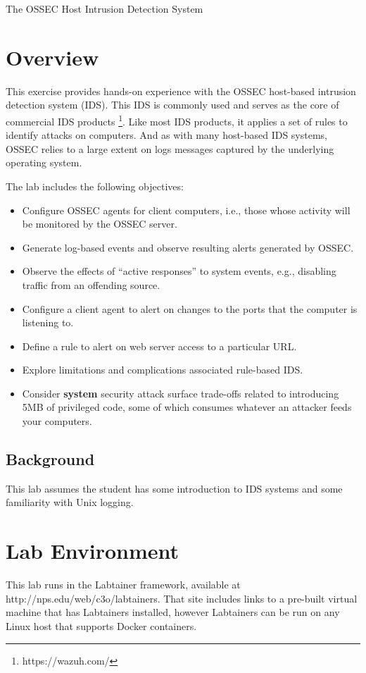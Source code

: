 


\begin{center}
{\LARGE The OSSEC Host Intrusion Detection System}
\vspace{0.1in}\\
\end{center}


\section{Overview}
This exercise provides hands-on experience with the OSSEC
host-based intrusion detection system (IDS).  This IDS is commonly used and serves as the core of commercial IDS products
\footnote{https://wazuh.com/}.  Like most IDS products, it applies a set of rules to identify attacks on computers.
And as with many host-based IDS systems, OSSEC relies to a large extent on 
logs messages captured by the underlying operating system.

The lab includes the following objectives:
\begin{itemize}
\item Configure OSSEC agents for client computers, i.e., those whose activity will be monitored by the OSSEC server.
\item Generate log-based events and observe resulting alerts generated by OSSEC.
\item Observe the effects of ``active responses'' to system events, e.g., disabling traffic from an offending source.
\item Configure a client agent to alert on changes to the ports that the computer is listening to.
\item Define a rule to alert on web server access to a particular URL.
\item Explore limitations and complications associated rule-based IDS.
\item Consider \textbf{system} security attack surface trade-offs related to introducing 5MB of privileged code, some of which 
consumes whatever an attacker feeds your computers.
\end{itemize}

\subsection{Background}
This lab assumes the student has some introduction to IDS systems and
some familiarity with Unix logging.

\section{Lab Environment}
This lab runs in the Labtainer framework,
available at http://nps.edu/web/c3o/labtainers.
That site includes links to a pre-built virtual machine
that has Labtainers installed, however Labtainers can
be run on any Linux host that supports Docker containers.

